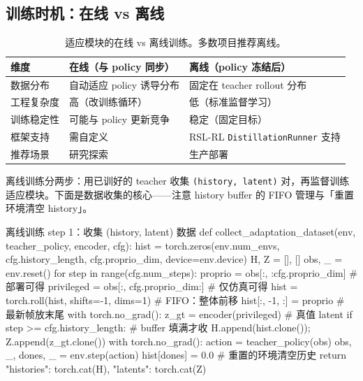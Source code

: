 \subsection{训练时机：在线 vs 离线}
\label{sec:rlmc-priv-onlineoffline}

\begin{table}[H]
\centering
\small
\caption{适应模块的在线 vs 离线训练。多数项目推荐离线。}
\label{tab:rlmc-priv-onoff}
\begin{tabular}{@{}llp{4.0cm}@{}}
\toprule
维度 & 在线（与 policy 同步） & 离线（policy 冻结后） \\
\midrule
数据分布 & 自动适应 policy 诱导分布 & 固定在 teacher rollout 分布 \\
工程复杂度 & 高（改训练循环） & 低（标准监督学习） \\
训练稳定性 & 可能与 policy 更新竞争 & 稳定（固定目标） \\
框架支持 & 需自定义 & RSL-RL \texttt{DistillationRunner} 支持 \\
推荐场景 & 研究探索 & 生产部署 \\
\bottomrule
\end{tabular}
\end{table}

离线训练分两步：用已训好的 teacher 收集 \verb|(history, latent)| 对，再监督训练适应模块。下面是数据收集的核心——注意 history buffer 的 FIFO 管理与「重置环境清空 history」。

\begin{codebox}[Python]{离线训练 step 1：收集 (history, latent) 数据}
def collect_adaptation_dataset(env, teacher_policy, encoder, cfg):
    hist = torch.zeros(env.num_envs, cfg.history_length, cfg.proprio_dim,
                       device=env.device)
    H, Z = [], []
    obs, _ = env.reset()
    for step in range(cfg.num_steps):
        proprio    = obs[:, :cfg.proprio_dim]          # 部署可得
        privileged = obs[:, cfg.proprio_dim:]          # 仅仿真可得
        hist = torch.roll(hist, shifts=-1, dims=1)      # FIFO：整体前移
        hist[:, -1, :] = proprio                        # 最新帧放末尾
        with torch.no_grad():
            z_gt = encoder(privileged)                  # 真值 latent
        if step >= cfg.history_length:                  # buffer 填满才收
            H.append(hist.clone()); Z.append(z_gt.clone())
        with torch.no_grad():
            action = teacher_policy(obs)
        obs, _, dones, _ = env.step(action)
        hist[dones] = 0.0                               # 重置的环境清空历史
    return {"histories": torch.cat(H), "latents": torch.cat(Z)}
\end{codebox}

